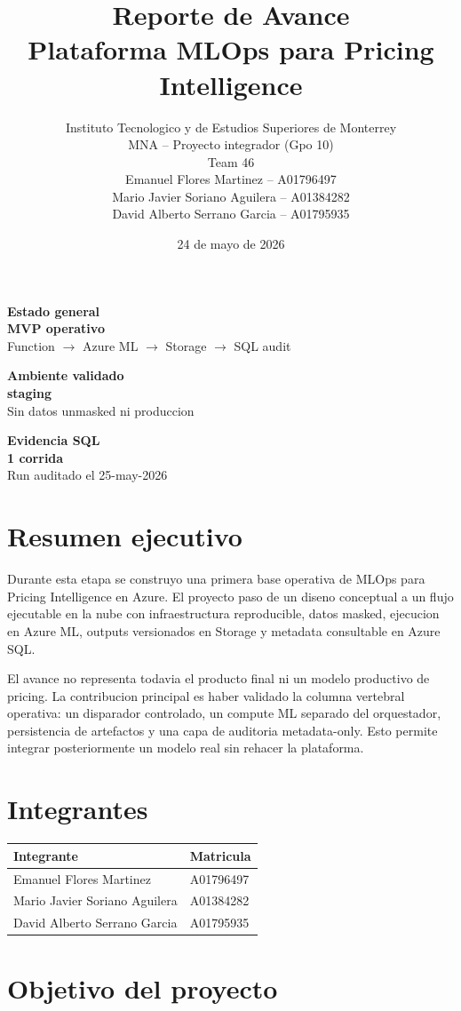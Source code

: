 \documentclass[11pt,letterpaper]{article}
\title{
  \textbf{Reporte de Avance}\\
  Plataforma MLOps para Pricing Intelligence
}
\author{
  Instituto Tecnologico y de Estudios Superiores de Monterrey\\
  MNA -- Proyecto integrador (Gpo 10)\\
  Team 46\\[0.5em]
  Emanuel Flores Martinez -- A01796497\\
  Mario Javier Soriano Aguilera -- A01384282\\
  David Alberto Serrano Garcia -- A01795935
}
\date{24 de mayo de 2026}
\newcommand{\metricbox}[3]{
  \begin{minipage}[t]{0.30\linewidth}
    \colorbox{grisFondo}{
      \parbox{\dimexpr\linewidth-2\fboxsep\relax}{
        \textcolor{azulTec}{\textbf{#1}}\\[0.3em]
        {\Large \textbf{#2}}\\[-0.1em]
        {\small #3}
      }
    }
  \end{minipage}
}
\begin{document}
\maketitle

\begin{center}
\metricbox{Estado general}{MVP operativo}{Function $\rightarrow$ Azure ML $\rightarrow$ Storage $\rightarrow$ SQL audit}
\hfill
\metricbox{Ambiente validado}{staging}{Sin datos unmasked ni produccion}
\hfill
\metricbox{Evidencia SQL}{1 corrida}{Run auditado el 25-may-2026}
\end{center}

\section*{Resumen ejecutivo}

Durante esta etapa se construyo una primera base operativa de MLOps para Pricing Intelligence en Azure. El proyecto paso de un diseno conceptual a un flujo ejecutable en la nube con infraestructura reproducible, datos masked, ejecucion en Azure ML, outputs versionados en Storage y metadata consultable en Azure SQL.

El avance no representa todavia el producto final ni un modelo productivo de pricing. La contribucion principal es haber validado la columna vertebral operativa: un disparador controlado, un compute ML separado del orquestador, persistencia de artefactos y una capa de auditoria metadata-only. Esto permite integrar posteriormente un modelo real sin rehacer la plataforma.

\section*{Integrantes}

\begin{table}[h!]
\centering
\begin{tabular}{ll}
\toprule
\textbf{Integrante} & \textbf{Matricula}\\
\midrule
Emanuel Flores Martinez & A01796497\\
Mario Javier Soriano Aguilera & A01384282\\
David Alberto Serrano Garcia & A01795935\\
\bottomrule
\end{tabular}
\end{table}

\section*{Objetivo del proyecto}
\end{document}
